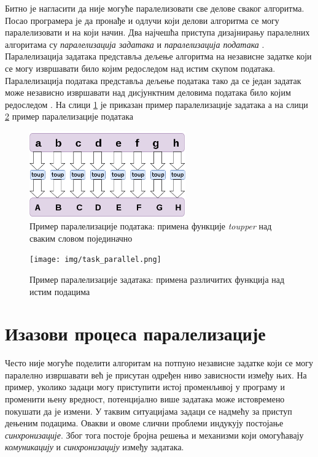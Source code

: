 \documentclass[12pt,oneside]{memoir}
\begin{document}
  Битно је нагласити да није могуће паралелизовати све делове сваког алгоритма. Посао програмера је да пронађе и одлучи који делови алгоритма се могу паралелизовати и на који начин.
 Два најчешћа приступа дизајнирању паралелних алгоритама су \textit{паралелизација задатака} и \textit{паралелизација података} \cite{art_conc}. 
Паралелизација задатака представља дељење алгоритма на независне задатке који се могу извршавати било којим редоследом над истим скупом података.
Паралелизација података представља дељење података тако да се један задатак може независно извршавати над дисјунктним деловима података било којим редоследом \cite{art_conc}. 
На слици  \ref{fig:data_parallel} је приказан пример паралелизације задатака а на слици \ref{fig:task_parallel} пример паралелизације података

\begin{figure}[!ht]
  \centering
  \includegraphics[width=0.6\textwidth]{img/data_parallel.png}
  \caption{Пример паралелизације података: примена функције \textit{toupper} над сваким словом појединачно}
  \label{fig:data_parallel}
\end{figure}

\begin{figure}[!ht]
  \centering
  \texttt{[image: img/task\_parallel.png]}
  \caption{Пример паралелизације задатака: примена различитих функција над истим подацима}
  \label{fig:task_parallel}
\end{figure}


  \section{Изазови процеса паралелизације}
  Често није могуће поделити алгоритам на потпуно независне задатке који се могу паралелно извршавати већ је присутан одређен ниво зависности између њих. На пример, уколико задаци могу приступити истој променљивој у програму и променити њену вредност, потенцијално више задатака може истовремено покушати да је измени. У таквим ситуацијама задаци се надмећу за приступ дењеним подацима.  Овакви и овоме слични проблеми индукују постојање \textit{синхронизације}. Због тога постоје бројна решења и механизми који омогућавају \textit{комуникацију} и  \textit{синхронизацију} између задатака.
  
\end{document}
